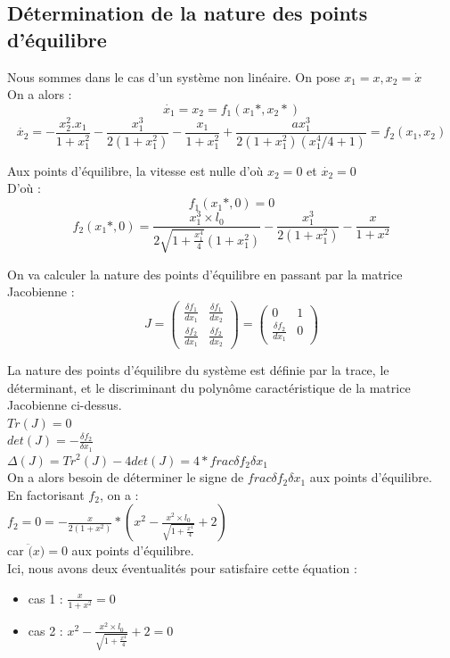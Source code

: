 \documentclass[10pt,a4paper]{article}
\begin{document}
\subsection{Détermination de la nature des points d'équilibre}
Nous sommes dans le cas d'un système non linéaire.
On pose $x_1=x, x_2=\dot{x}$\\
On a alors :
\[\dot{x_1}=x_2=f_1(x_1*,x_2*)\]
\[ \dot{x_2}=-\frac{x^2_2.x_1}{1+x^2_1} - \frac{x^3_1}{2(1+x^2_1)} - \frac{x_1}{1+x^2_1} + \frac{ax^3_1}{2(1+x^2_1)(x^4_1/4 + 1)}=f_2(x_1,x_2) \]



Aux points d'équilibre, la vitesse est nulle d'où $x_2=0$ et $\dot{x_2}=0$\\
D'où :\\
\[ f_1(x_1*,0) = 0 \]
\[ f_2(x_1*,0) = \frac{x_1^3\times l_0}{2\sqrt{1+\frac{x_1^4}{4}}(1+x_1^2)}-\frac{x_1^3}{2(1+x_1^2)} - \frac{x}{1+x^2} \]

On va calculer la nature des points d'équilibre en passant par la matrice Jacobienne :\\
\[
J=
\begin{pmatrix}
\frac{\delta f_1}{dx_1} & \frac{\delta f_1}{dx_2} \\
\frac{\delta f_2}{dx_1} & \frac{\delta f_2}{dx_2}
\end{pmatrix}
=
\begin{pmatrix}
0&1\\
\frac{\delta f_2}{dx_1}&0
\end{pmatrix}
\]

La nature des points d'équilibre du système est définie par la trace, le déterminant, et le discriminant du polynôme caractéristique de la matrice Jacobienne ci-dessus.\\
$ Tr(J) = 0 $\\
$ det(J) = -\frac{\delta f_2}{\delta x_1} $\\
$ \Delta(J) = Tr^2(J) - 4det(J) = 4*frac{\delta f_2}{\delta x_1} $\\

On a alors besoin de déterminer le signe de $frac{\delta f_2}{\delta x_1}$ aux points d'équilibre.\\

En factorisant $f_2$, on a : \\
$f_2=0=-\frac{x}{2(1+x^2)}*(x^2-\frac{x^2\times l_0}{\sqrt{1+\frac{x^4}{4}}}+2)$\\
car $\ddot(x)=0$ aux points d'équilibre.\\

Ici, nous avons deux éventualités pour satisfaire cette équation :\\
\begin{itemize}
\item cas 1 : $\frac{x}{1+x^2}=0$\\
\item cas 2 : $x^2-\frac{x^2\times l_0}{\sqrt{1+\frac{x^4}{4}}}+2=0$\\
\end{itemize}
\end{document}
